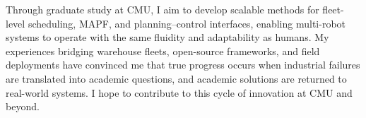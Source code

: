 \documentclass[12pt]{article}
\begin{document}
\vspace{0.5em}
Through graduate study at CMU, I aim to develop scalable methods for fleet-level scheduling, MAPF, and planning–control interfaces, enabling multi-robot systems to operate with the same fluidity and adaptability as humans. My experiences bridging warehouse fleets, open-source frameworks, and field deployments have convinced me that true progress occurs when industrial failures are translated into academic questions, and academic solutions are returned to real-world systems. I hope to contribute to this cycle of innovation at CMU and beyond.
\end{document}
